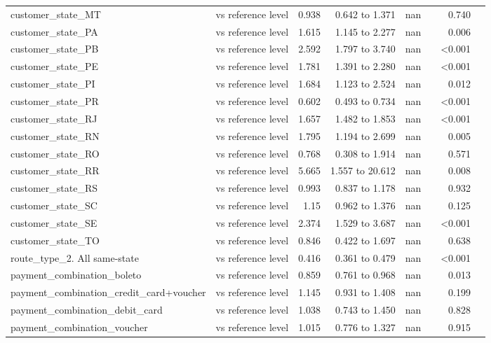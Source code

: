 \begin{table}[htbp]
\begin{tabular}{lrrrrrrr}
customer\_state\_MT & vs reference level & 0.938 & 0.642 to 1.371 & nan &  & 0.740 &  \\
customer\_state\_PA & vs reference level & 1.615 & 1.145 to 2.277 & nan &  & 0.006 &  \\
customer\_state\_PB & vs reference level & 2.592 & 1.797 to 3.740 & nan &  & <0.001 &  \\
customer\_state\_PE & vs reference level & 1.781 & 1.391 to 2.280 & nan &  & <0.001 &  \\
customer\_state\_PI & vs reference level & 1.684 & 1.123 to 2.524 & nan &  & 0.012 &  \\
customer\_state\_PR & vs reference level & 0.602 & 0.493 to 0.734 & nan &  & <0.001 &  \\
customer\_state\_RJ & vs reference level & 1.657 & 1.482 to 1.853 & nan &  & <0.001 &  \\
customer\_state\_RN & vs reference level & 1.795 & 1.194 to 2.699 & nan &  & 0.005 &  \\
customer\_state\_RO & vs reference level & 0.768 & 0.308 to 1.914 & nan &  & 0.571 &  \\
customer\_state\_RR & vs reference level & 5.665 & 1.557 to 20.612 & nan &  & 0.008 &  \\
customer\_state\_RS & vs reference level & 0.993 & 0.837 to 1.178 & nan &  & 0.932 &  \\
customer\_state\_SC & vs reference level & 1.15 & 0.962 to 1.376 & nan &  & 0.125 &  \\
customer\_state\_SE & vs reference level & 2.374 & 1.529 to 3.687 & nan &  & <0.001 &  \\
customer\_state\_TO & vs reference level & 0.846 & 0.422 to 1.697 & nan &  & 0.638 &  \\
route\_type\_2. All same-state & vs reference level & 0.416 & 0.361 to 0.479 & nan &  & <0.001 &  \\
payment\_combination\_boleto & vs reference level & 0.859 & 0.761 to 0.968 & nan &  & 0.013 &  \\
payment\_combination\_credit\_card+voucher & vs reference level & 1.145 & 0.931 to 1.408 & nan &  & 0.199 &  \\
payment\_combination\_debit\_card & vs reference level & 1.038 & 0.743 to 1.450 & nan &  & 0.828 &  \\
payment\_combination\_voucher & vs reference level & 1.015 & 0.776 to 1.327 & nan &  & 0.915 &  \\
\bottomrule
\end{tabular}
\par\smallskip\begin{minipage}{\linewidth}\footnotesize \end{minipage}
\end{table}

